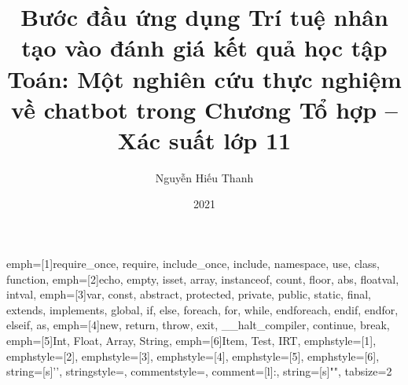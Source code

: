 \everymath{\displaystyle}

 {
	emph=[1]{require_once, require, include_once, include, namespace, use, class, function},
	emph=[2]{echo, empty, isset, array, instanceof, count, floor, abs, floatval, intval},
	emph=[3]{var, const, abstract, protected, private, public, static, final, extends, implements, global, if, else, foreach, for, while, endforeach, endif, endfor, elseif, as},
	emph=[4]{new, return, throw, exit, __halt_compiler, continue, break},
	emph=[5]{Int, Float, Array, String},
	emph=[6]{Item, Test, IRT},
	emphstyle=[1]\color{mBlue},
	emphstyle=[2]\color{mTeal},
	emphstyle=[3]\color{mBlue},
	emphstyle=[4]\color{mRed},
	emphstyle=[5]\color{mDeepOrange},
	emphstyle=[6]\color{mPink},
	string=[s]{'}{'},
}
 {
	stringstyle=\color{mTeal},
	commentstyle=\color{black},
	comment=[l]{:},
	string=[s]{"}{"},
	tabsize=2
}

\lstset{style=domthanh}
\renewcommand{\lstlistingname}{Code}
\renewcommand{\lstlistlistingname}{Danh sách Code minh họa}

\title{Bước đầu ứng dụng Trí tuệ nhân tạo vào đánh giá kết quả học tập Toán: Một nghiên cứu thực nghiệm về chatbot trong Chương Tổ hợp – Xác suất lớp 11}
\author{Nguyễn Hiếu Thanh}
\date{2021}


